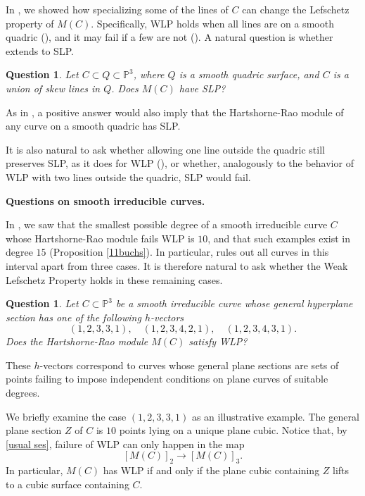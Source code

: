 \documentclass[12pt]{amsart}%
\numberwithin{equation}{section}
\newtheorem{question}[theorem]{Question}
\theoremstyle{definition}
\numberwithin{equation}{section}
\newcommand{\PP}{ \ensuremath{\mathbb{P}}}
\begin{document}
{In , we showed how specializing some of the lines of $C$ can change the Lefschetz property of $M(C)$. Specifically, WLP holds when all lines are on a smooth quadric (), and it may fail if a few are not (). A natural question is whether  extends to SLP. 

\begin{question}
    Let $C\subset Q\subset \PP^3$, where $Q$ is a smooth quadric surface, and $C$ is a union of skew lines in $Q$. Does $M(C)$ have SLP?
\end{question}

As in , a positive answer would also imply that the Hartshorne-Rao module of any curve on a smooth quadric has SLP. 

It is also natural to ask whether allowing one line outside the quadric still preserves SLP, as it does for WLP (), or whether, analogously to the behavior of WLP with two lines outside the quadric, SLP would fail.\hfill\break

\textbf{Questions on smooth irreducible curves.} 

In , we saw that the smallest possible degree of a smooth irreducible curve $C$ whose Hartshorne-Rao module fails WLP is $10$, and that such examples exist in degree $15$ (Proposition \ref{11buchs}). In particular,  rules out all curves in this interval apart from three cases. It is therefore natural to ask whether the Weak Lefschetz Property holds in these remaining cases. 

\begin{question}
Let $C \subset \PP^3$ be a smooth irreducible curve whose general hyperplane section  has one of the following $h$-vectors 
\[
(1,2,3,3,1),\quad (1,2,3,4,2,1),\quad (1,2,3,4,3,1).
\]
Does the Hartshorne-Rao module $M(C)$ satisfy WLP?
\end{question}
These $h$-vectors correspond to curves whose general plane sections are sets of points failing to impose independent conditions on plane curves {of suitable degrees}. 

We briefly examine the case $(1,2,3,3,1)$ as an illustrative example. The general plane section $Z$ of $C$ is $10$ points lying on a unique plane cubic. Notice that, by \eqref{usual ses}, failure of WLP can only happen in the map $$[M(C)]_2\to [M(C)]_3.$$ In particular, $M(C)$ has WLP if and only if the plane cubic containing $Z$ lifts to a cubic surface containing $C$. 

}
\end{document}
